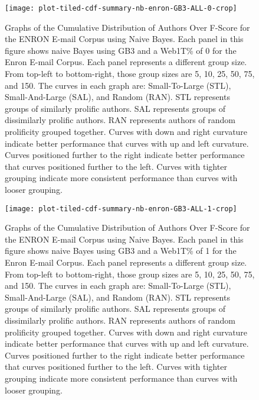 	
	\begin{figure}[htbp!]
		\begin{center}
		\centering
		\texttt{[image: plot-tiled-cdf-summary-nb-enron-GB3-ALL-0-crop]}
		\caption{Graphs of the Cumulative Distribution of Authors Over F-Score for the ENRON E-mail Corpus using Naive Bayes. Each panel in this figure shows naive Bayes using GB3 and a Web1T\% of 0 for the Enron E-mail Corpus.  Each panel represents a different group size.  From top-left to bottom-right, those group sizes are 5, 10, 25, 50, 75, and 150. The curves in each graph are: Small-To-Large (STL), Small-And-Large (SAL), and Random (RAN).  STL represents groups of similarly prolific authors.  SAL represents groups of dissimilarly prolific authors.  RAN represents authors of random prolificity grouped together.  Curves with down and right curvature indicate better performance that curves with up and left curvature.  Curves positioned further to the right indicate better performance that curves positioned further to the left.  Curves with tighter grouping indicate more consistent performance than curves with looser grouping.}
		\label{fig:plot-tiled-cdf-summary-nb-enron-GB3-ALL-0}
		\end{center}
	\end{figure}
	
	\begin{figure}[htbp!]
		\begin{center}
		\centering
		\texttt{[image: plot-tiled-cdf-summary-nb-enron-GB3-ALL-1-crop]}
		\caption{Graphs of the Cumulative Distribution of Authors Over F-Score for the ENRON E-mail Corpus using Naive Bayes. Each panel in this figure shows naive Bayes using GB3 and a Web1T\% of 1 for the Enron E-mail Corpus.  Each panel represents a different group size.  From top-left to bottom-right, those group sizes are 5, 10, 25, 50, 75, and 150. The curves in each graph are: Small-To-Large (STL), Small-And-Large (SAL), and Random (RAN).  STL represents groups of similarly prolific authors.  SAL represents groups of dissimilarly prolific authors.  RAN represents authors of random prolificity grouped together.  Curves with down and right curvature indicate better performance that curves with up and left curvature.  Curves positioned further to the right indicate better performance that curves positioned further to the left.  Curves with tighter grouping indicate more consistent performance than curves with looser grouping.}
		\label{fig:plot-tiled-cdf-summary-nb-enron-GB3-ALL-1}
		\end{center}
	\end{figure}


